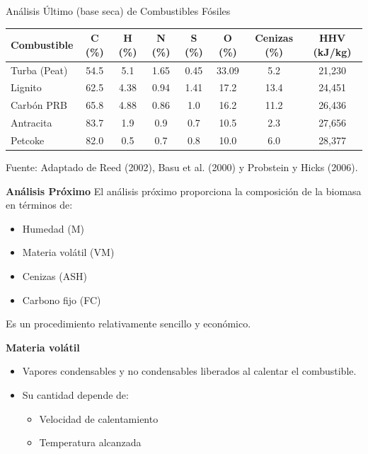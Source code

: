 \documentclass[../../main.tex]{subfiles}
\begin{document}
\begin{frame}{Análisis Último (base seca) de Combustibles Fósiles}
\scriptsize
\centering
\begin{tabular}{lccccccc}
\toprule
\textbf{Combustible} & \textbf{C (\%)} & \textbf{H (\%)} & \textbf{N (\%)} & \textbf{S (\%)} & \textbf{O (\%)} & \textbf{Cenizas (\%)} & \textbf{HHV (kJ/kg)} \\
\midrule
Turba (Peat)          & 54.5 & 5.1 & 1.65 & 0.45 & 33.09 & 5.2  & 21,230 \\
Lignito               & 62.5 & 4.38 & 0.94 & 1.41 & 17.2  & 13.4 & 24,451 \\
Carbón PRB            & 65.8 & 4.88 & 0.86 & 1.0  & 16.2  & 11.2 & 26,436 \\
Antracita             & 83.7 & 1.9  & 0.9  & 0.7  & 10.5  & 2.3  & 27,656 \\
Petcoke               & 82.0 & 0.5  & 0.7  & 0.8  & 10.0  & 6.0  & 28,377 \\
\bottomrule
\end{tabular}

\vspace{0.8em}
\scriptsize{Fuente: Adaptado de Reed (2002), Basu et al. (2000) y Probstein y Hicks (2006).}
\end{frame}












\begin{frame}{\textbf{An\'alisis Pr\'oximo}}
El an\'alisis pr\'oximo proporciona la composici\'on de la biomasa en t\'erminos de:
\begin{itemize}
    \item Humedad (M)
    \item Materia vol\'atil (VM)
    \item Cenizas (ASH)
    \item Carbono fijo (FC)
\end{itemize}
Es un procedimiento relativamente sencillo y econ\'omico.


\textbf{Materia vol\'atil}
\begin{itemize}
    \item Vapores condensables y no condensables liberados al calentar el combustible.
    \item Su cantidad depende de:
    \begin{itemize}
        \item Velocidad de calentamiento
        \item Temperatura alcanzada
    \end{itemize}
\end{itemize}
\end{frame}
\end{document}
